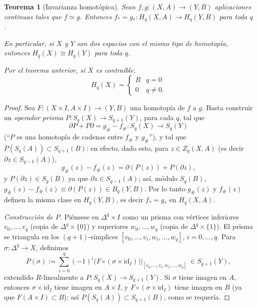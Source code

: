 \documentclass[11pt,a4paper]{article}
\theoremstyle{plain}
\newtheorem{theorem}{Teorema}[section]
\theoremstyle{definition}
\theoremstyle{remark}
\begin{document}
\begin{theorem}[Invarianza homotópica]
\label{thm:invarianza-homotopica}
Sean $f,g:(X,A)\to(Y,B)$ aplicaciones continuas tales que $f\simeq g$.
Entonces $f_*=g_*:H_q(X,A)\to H_q(Y,B)$ para toda $q$.

En particular, si $X$ y $Y$ son dos espacios con el mismo tipo de
homotopía, entonces $H_q(X)\cong H_q(Y)$ para toda $q$.

Por el teorema anterior, si $X$ es contraíble,
\[
H_q(X)=\begin{cases}R & q=0\\0 & q\ne0.\end{cases}
\]
\end{theorem}

\begin{proof}
Sea $F:(X\times I,A\times I)\to(Y,B)$ una homotopía de $f$ a $g$. Basta
construir un \emph{operador prisma}
$P:S_q(X)\to S_{q+1}(Y)$, para cada $q$, tal que
\[
\partial P+P\partial=g_\#-f_\#:S_q(X)\to S_q(Y)
\]
(``$P$ es una homotopía de cadenas entre $f_\#$ y $g_\#$''), y tal que
$P(S_q(A))\subset S_{q+1}(B)$: en efecto, dado esto, para
$z\in Z_q(X,A)$ (es decir $\partial z\in S_{q-1}(A)$),
\[
g_\#(z)-f_\#(z)=\partial(P(z))+P(\partial z),
\]
y $P(\partial z)\in S_q(B)$ ya que $\partial z\in S_{q-1}(A)$; así, módulo
$S_q(B)$, $g_\#(z)-f_\#(z)\equiv\partial(P(z))\in B_q(Y,B)$. Por lo tanto
$g_\#(z)$ y $f_\#(z)$ definen la misma clase en $H_q(Y,B)$, es decir
$f_*=g_*$ en $H_q(X,A)$.

\emph{Construcción de $P$.} Piénsese en $\Delta^q\times I$ como un prisma
con vértices inferiores $v_0,\dots,v_q$ (copia de $\Delta^q\times\{0\}$) y
superiores $w_0,\dots,w_q$ (copia de $\Delta^q\times\{1\}$). El prisma se
triangula en los $(q+1)$-símplices
$[v_0,\dots,v_i,w_i,\dots,w_q]$, $i=0,\dots,q$. Para
$\sigma:\Delta^q\to X$, definimos
\[
P(\sigma):=\sum_{i=0}^q(-1)^i\big(F\circ(\sigma\times\mathrm{id}_I)\big)\big|_{[v_0,\dots,v_i,w_i,\dots,w_q]}\ \in S_{q+1}(Y),
\]
extendido $R$-linealmente a $P:S_q(X)\to S_{q+1}(Y)$. Si $\sigma$ tiene
imagen en $A$, entonces $\sigma\times\mathrm{id}_I$ tiene imagen en
$A\times I$, y $F\circ(\sigma\times\mathrm{id}_I)$ tiene imagen en $B$ (ya
que $F(A\times I)\subset B$); así $P(S_q(A))\subset S_{q+1}(B)$, como se
requería.


\end{proof}
\end{document}
